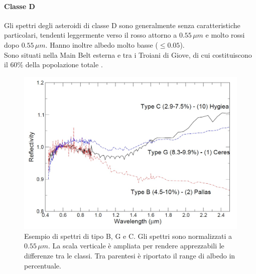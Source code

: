 \documentclass[a4paper,11pt,openright]{book}
\begin{document}
\paragraph*{Classe D}
Gli spettri degli asteroidi di classe D sono generalmente senza caratteristiche particolari, tendenti leggermente verso il rosso attorno a $0.55\,\mu m$ e molto rossi dopo $0.55\,\mu m$. Hanno inoltre albedo molto basse ($\leq 0.05$).\\
Sono situati nella Main Belt esterna e tra i Troiani di Giove, di cui costituiscono il 60\% della popolazione totale \citep{VILAS1985503}.

\begin{figure}
    \centering
    \includegraphics[scale=0.3]{figure/spettro_bgc.jpg}
    \caption[Esempio di spettri di tipo B, G e C.]{Esempio di spettri di tipo B, G e C. Gli spettri sono normalizzati a $0.55\,\mu m$. La scala verticale è ampliata per rendere apprezzabili le differenze tra le classi. Tra parentesi è riportato il range di albedo in percentuale. \citep{magrin_spectroscopic_nodate}}
    \label{spettro_bgc}
\end{figure}
\end{document}

